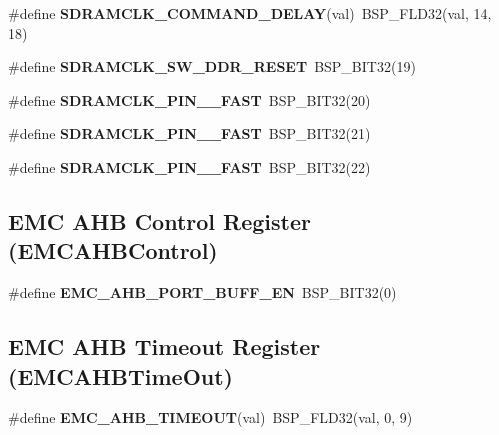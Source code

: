 \begin{DoxyCompactItemize}
\item 
\mbox{\label{group__lpc__emc_ga268e153fe97391c55e7175a1ac0a0918}} 
\#define {\bfseries S\+D\+R\+A\+M\+C\+L\+K\+\_\+\+C\+O\+M\+M\+A\+N\+D\+\_\+\+D\+E\+L\+AY}(val)~B\+S\+P\+\_\+\+F\+L\+D32(val, 14, 18)
\item 
\mbox{\label{group__lpc__emc_ga1bb886eb7a7784b939da5c934b70c121}} 
\#define {\bfseries S\+D\+R\+A\+M\+C\+L\+K\+\_\+\+S\+W\+\_\+\+D\+D\+R\+\_\+\+R\+E\+S\+ET}~B\+S\+P\+\_\+\+B\+I\+T32(19)
\item 
\mbox{\label{group__lpc__emc_ga83871e8ed873f8fb663595d451b35bf0}} 
\#define {\bfseries S\+D\+R\+A\+M\+C\+L\+K\+\_\+\+P\+I\+N\+\_\+\_\+\+F\+A\+ST}~B\+S\+P\+\_\+\+B\+I\+T32(20)
\item 
\mbox{\label{group__lpc__emc_ga80713b5124e67d8623f0f5b7dcf1799e}} 
\#define {\bfseries S\+D\+R\+A\+M\+C\+L\+K\+\_\+\+P\+I\+N\+\_\+\_\+\+F\+A\+ST}~B\+S\+P\+\_\+\+B\+I\+T32(21)
\item 
\mbox{\label{group__lpc__emc_ga17981c415c18f5d8010c52dfb66863f0}} 
\#define {\bfseries S\+D\+R\+A\+M\+C\+L\+K\+\_\+\+P\+I\+N\+\_\+\_\+\+F\+A\+ST}~B\+S\+P\+\_\+\+B\+I\+T32(22)
\end{DoxyCompactItemize}
\subsection*{E\+MC A\+HB Control Register (E\+M\+C\+A\+H\+B\+Control)}
\begin{DoxyCompactItemize}
\item 
\mbox{\label{group__lpc__emc_ga5be413000c2415fc20c096403955bd03}} 
\#define {\bfseries E\+M\+C\+\_\+\+A\+H\+B\+\_\+\+P\+O\+R\+T\+\_\+\+B\+U\+F\+F\+\_\+\+EN}~B\+S\+P\+\_\+\+B\+I\+T32(0)
\end{DoxyCompactItemize}
\subsection*{E\+MC A\+HB Timeout Register (E\+M\+C\+A\+H\+B\+Time\+Out)}
\begin{DoxyCompactItemize}
\item 
\mbox{\label{group__lpc__emc_ga382dfa9bbc97be56d65f0b47f803a8ea}} 
\#define {\bfseries E\+M\+C\+\_\+\+A\+H\+B\+\_\+\+T\+I\+M\+E\+O\+UT}(val)~B\+S\+P\+\_\+\+F\+L\+D32(val, 0, 9)
\end{DoxyCompactItemize}
